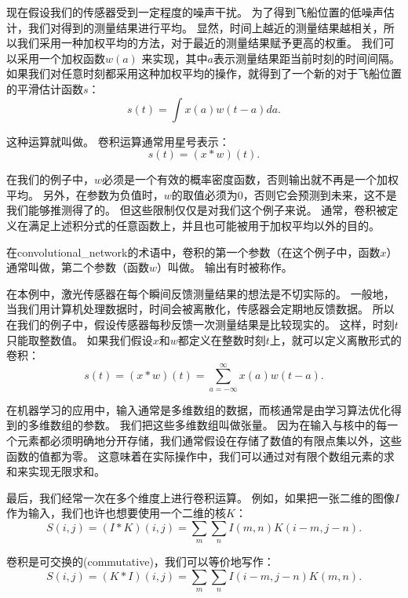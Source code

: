 现在假设我们的传感器受到一定程度的噪声干扰。
为了得到飞船位置的低噪声估计，我们对得到的测量结果进行平均。
显然，时间上越近的测量结果越相关，所以我们采用一种加权平均的方法，对于最近的测量结果赋予更高的权重。
我们可以采用一个加权函数$w(a)$ 来实现，其中$a$表示测量结果距当前时刻的时间间隔。
如果我们对任意时刻都采用这种加权平均的操作，就得到了一个新的对于飞船位置的平滑估计函数$s$：
\begin{equation}
s(t) = \int x(a)w(t-a)da.
\end{equation}

这种运算就叫做。
卷积运算通常用星号表示：
\begin{equation}
s(t) = (x*w)(t).
\end{equation}

在我们的例子中，$w$必须是一个有效的概率密度函数，否则输出就不再是一个加权平均。
另外，在参数为负值时，$w$的取值必须为0，否则它会预测到未来，这不是我们能够推测得了的。
但这些限制仅仅是对我们这个例子来说。
通常，卷积被定义在满足上述积分式的任意函数上，并且也可能被用于加权平均以外的目的。

在\gls{convolutional_network}的术语中，卷积的第一个参数（在这个例子中，函数$x$）通常叫做，第二个参数（函数$w$）叫做。
输出有时被称作。

 
在本例中，激光传感器在每个瞬间反馈测量结果的想法是不切实际的。
一般地，当我们用计算机处理数据时，时间会被离散化，传感器会定期地反馈数据。
所以在我们的例子中，假设传感器每秒反馈一次测量结果是比较现实的。
这样，时刻$t$只能取整数值。
如果我们假设$x$和$w$都定义在整数时刻$t$上，就可以定义离散形式的卷积：
\begin{equation}
s(t) = (x*w)(t) = \sum_{a = -\infty}^{\infty} x(a)w(t-a).
\end{equation}

在机器学习的应用中，输入通常是多维数组的数据，而核通常是由学习算法优化得到的多维数组的参数。
我们把这些多维数组叫做张量。
因为在输入与核中的每一个元素都必须明确地分开存储，我们通常假设在存储了数值的有限点集以外，这些函数的值都为零。
这意味着在实际操作中，我们可以通过对有限个数组元素的求和来实现无限求和。

最后，我们经常一次在多个维度上进行卷积运算。
例如，如果把一张二维的图像$I$作为输入，我们也许也想要使用一个二维的核$K$：
\begin{equation}
S(i,j) = (I*K)(i,j) = \sum_m \sum_n I(m,n) K(i-m, j-n).
\end{equation}

卷积是可交换的(commutative)，我们可以等价地写作：
\begin{equation}
S(i, j) = (K*I)(i,j) = \sum_m \sum_n I(i-m, j-n) K(m, n).
\end{equation}

